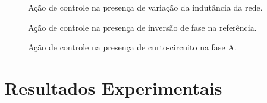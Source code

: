   \begin{figure}[!h]
    \centering
      \def\svgwidth{\textwidth}
      
    \renewcommand\figurename{Fig.}
    \caption{Ação de controle na presença de variação da indutância da rede.}
    \label{fig:up_simulacao_Lg}
  \end{figure}

  \begin{figure}[!h]
    \centering
      \def\svgwidth{\textwidth}
      
    \renewcommand\figurename{Fig.}
    \caption{Ação de controle na presença de inversão de fase na referência.}
    \label{fig:up_simulacao_phase}
  \end{figure}

  \begin{figure}[!h]
    \centering
      \def\svgwidth{\textwidth}
      
    \renewcommand\figurename{Fig.}
    \caption{Ação de controle na presença de curto-circuito na fase A.}
    \label{fig:up_simulacao_short}
  \end{figure}


\section{Resultados Experimentais}



